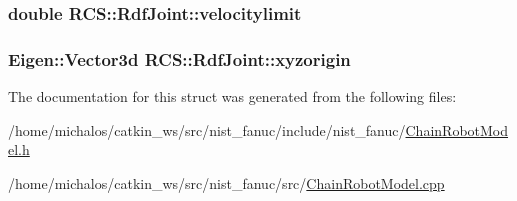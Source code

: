 \hypertarget{structRCS_1_1RdfJoint_a3419ee3cf55c8d8dd88fa7277a4dae12}{
\subsubsection[{velocitylimit}]{\setlength{\rightskip}{0pt plus 5cm}double R\-C\-S\-::\-Rdf\-Joint\-::velocitylimit}}\label{structRCS_1_1RdfJoint_a3419ee3cf55c8d8dd88fa7277a4dae12}
\hypertarget{structRCS_1_1RdfJoint_a37bb255f0c5c5bca1b6b64ff86e52aa6}{
\subsubsection[{xyzorigin}]{\setlength{\rightskip}{0pt plus 5cm}Eigen\-::\-Vector3d R\-C\-S\-::\-Rdf\-Joint\-::xyzorigin}}\label{structRCS_1_1RdfJoint_a37bb255f0c5c5bca1b6b64ff86e52aa6}


The documentation for this struct was generated from the following files\-:\begin{DoxyCompactItemize}
\item 
/home/michalos/catkin\-\_\-ws/src/nist\-\_\-fanuc/include/nist\-\_\-fanuc/\hyperlink{ChainRobotModel_8h}{Chain\-Robot\-Model.\-h}\item 
/home/michalos/catkin\-\_\-ws/src/nist\-\_\-fanuc/src/\hyperlink{ChainRobotModel_8cpp}{Chain\-Robot\-Model.\-cpp}\end{DoxyCompactItemize}
